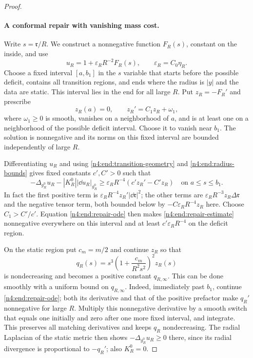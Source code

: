\begin{proof}
\paragraph{A conformal repair with vanishing mass cost.}
Write \(s=\mathfrak r/R\). We construct a nonnegative function
\(F_R(s)\), constant on the inside, and use
\[
 u_R=1+\varepsilon_RR^{-2}F_R(s),\qquad
 \varepsilon_R=C_0\eta_R.
\]
Choose a fixed interval \([a,b_1]\) in the \(s\) variable that starts
before the possible deficit, contains all transition regions, and ends
where the radius is \(|y|\) and the data are static. This interval lies
in the end for all large \(R\). Put \(z_R=-F_R'\) and prescribe
\begin{equation}\label{n4:end:repair-ode}
 z_R(a)=0,\qquad z_R'=C_1z_R+\omega_1,
\end{equation}
where \(\omega_1\ge0\) is smooth, vanishes on a neighborhood of \(a\),
and is at least one on a neighborhood of the possible deficit interval.
Choose it to vanish near \(b_1\). The solution is nonnegative and its
norms on this fixed interval are bounded independently of large \(R\).

Differentiating \(u_R\) and using \eqref{n4:end:transition-geometry} and
\eqref{n4:end:radius-bounds} gives fixed constants \(c',C'>0\) such that
\begin{equation}\label{n4:end:repair-estimate}
 -\Delta_{g_R^0}u_R-|K_R^0||\dd u_R|_{g_R^0}
 \ge\varepsilon_RR^{-4}(c'z_R'-C'z_R)
 \quad\text{on }a\le s\le b_1.
\end{equation}
In fact the first positive term is
\(\varepsilon_RR^{-4}z_R'|\dd\mathfrak r|^2\); the other terms are
\(\varepsilon_RR^{-3}z_R\Delta\mathfrak r\) and the negative tensor
term, both bounded below by \(-C\varepsilon_RR^{-4}z_R\) here.
Choose \(C_1>C'/c'\). Equation \eqref{n4:end:repair-ode} then makes
\eqref{n4:end:repair-estimate} nonnegative everywhere on this interval
and at least \(c'\varepsilon_RR^{-4}\) on the deficit region.

On the static region put \(c_m=m/2\) and continue \(z_R\) so that
\[
 q_R(s)=s^3\left(1+\frac{c_m}{R^2s^2}\right)^2z_R(s)
\]
is nondecreasing and becomes a positive constant \(q_{R,\infty}\).
This can be done smoothly with a uniform bound on \(q_{R,\infty}\).
Indeed, immediately past \(b_1\), continue \eqref{n4:end:repair-ode};
both its derivative and that of the positive prefactor make \(q_R'\)
nonnegative for large \(R\). Multiply this nonnegative derivative by
a smooth switch that equals one initially and zero after one more fixed
interval, and integrate. This preserves all matching derivatives and
keeps \(q_R\) nondecreasing. The radial Laplacian of the static metric
then shows \(-\Delta_{g_R^0}u_R\ge0\) there, since its radial divergence
is proportional to \(-q_R'\); also \(K_R^0=0\).


\end{proof}
